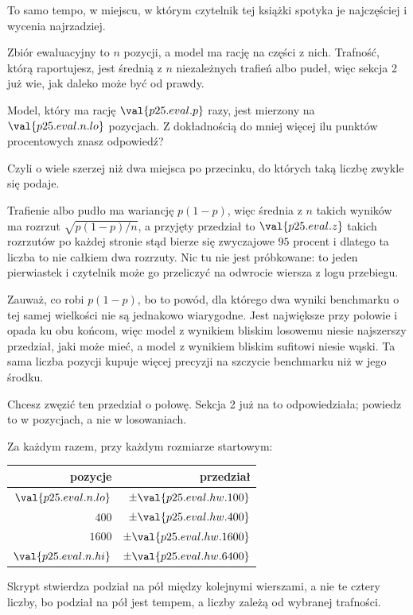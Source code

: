\begin{fr}
To samo tempo, w miejscu, w którym czytelnik tej książki spotyka je najczęściej
i wycenia najrzadziej.

Zbiór ewaluacyjny to $n$ pozycji, a model ma rację na części z nich. Trafność,
którą raportujesz, jest średnią z $n$ niezależnych trafień albo pudeł, więc
sekcja 2 już wie, jak daleko może być od prawdy.

Model, który ma rację $\val{p25.eval.p}$ razy, jest mierzony na
$\val{p25.eval.n.lo}$ pozycjach. Z dokładnością do mniej więcej ilu punktów
procentowych znasz odpowiedź?
\dotline
\nextframe
\end{fr}

\begin{fr}

Czyli o wiele szerzej niż dwa miejsca po przecinku, do których taką liczbę
zwykle się podaje.

Trafienie albo pudło ma wariancję $p(1-p)$, więc średnia z $n$ takich wyników
ma rozrzut $\sqrt{p(1-p)/n}$, a przyjęty przedział to $\val{p25.eval.z}$
takich rozrzutów po każdej stronie \dash{} stąd bierze się zwyczajowe $95$
procent i dlatego ta liczba to nie całkiem dwa rozrzuty. Nic tu nie jest
próbkowane: to jeden pierwiastek i czytelnik może go przeliczyć na odwrocie
wiersza z logu przebiegu.

Zauważ, co robi $p(1-p)$, bo to powód, dla którego dwa wyniki benchmarku o tej
samej wielkości nie są jednakowo wiarygodne. Jest największe przy połowie i
opada ku obu końcom, więc model z wynikiem bliskim losowemu niesie najszerszy
przedział, jaki może mieć, a model z wynikiem bliskim sufitowi niesie wąski.
Ta sama liczba pozycji kupuje więcej precyzji na szczycie benchmarku niż w
jego środku.

Chcesz zwęzić ten przedział o połowę. Sekcja 2 już na to odpowiedziała; powiedz
to w pozycjach, a nie w losowaniach.
\dotline
\nextframe
\end{fr}

\begin{fr}

Za każdym razem, przy każdym rozmiarze startowym:

\begin{center}
\begin{tabular}{rr}
\toprule
pozycje & przedział \\
\midrule
$\val{p25.eval.n.lo}$ & $\pm\val{p25.eval.hw.100}$ \\
$400$ & $\pm\val{p25.eval.hw.400}$ \\
$1600$ & $\pm\val{p25.eval.hw.1600}$ \\
$\val{p25.eval.n.hi}$ & $\pm\val{p25.eval.hw.6400}$ \\
\bottomrule
\end{tabular}
\end{center}

Skrypt stwierdza podział na pół między kolejnymi wierszami, a nie te cztery
liczby, bo podział na pół jest tempem, a liczby zależą od wybranej trafności.
\end{fr}

